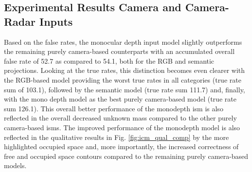 \subsection{Experimental Results Camera and Camera-Radar Inputs}
\label{subsec:exp_cam_fusion_in_deep_isms}
Based on the false rates, the monocular depth input model slightly outperforms the remaining purely camera-based counterparts with an accumulated overall false rate of 52.7 as compared to 54.1, both for the RGB and semantic projections. Looking at the true rates, this distinction becomes even clearer with the RGB-based model providing the worst true rates in all categories (true rate sum of 103.1), followed by the semantic model (true rate sum 111.7) and, finally, with the mono depth model as the best purely camera-based model (true rate sum 126.1). This overall better performance of the \gls{monodepth} \gls{ism} is also reflected in the overall decreased unknown mass compared to the other purely camera-based \gls{ism}s. The improved performance of the \gls{monodepth} model is also reflected in the qualitative results in Fig. \ref{fig:icm_qual_comp} by the more highlighted occupied space and, more importantly, the increased correctness of free and occupied space contours compared to the remaining purely camera-based models.
